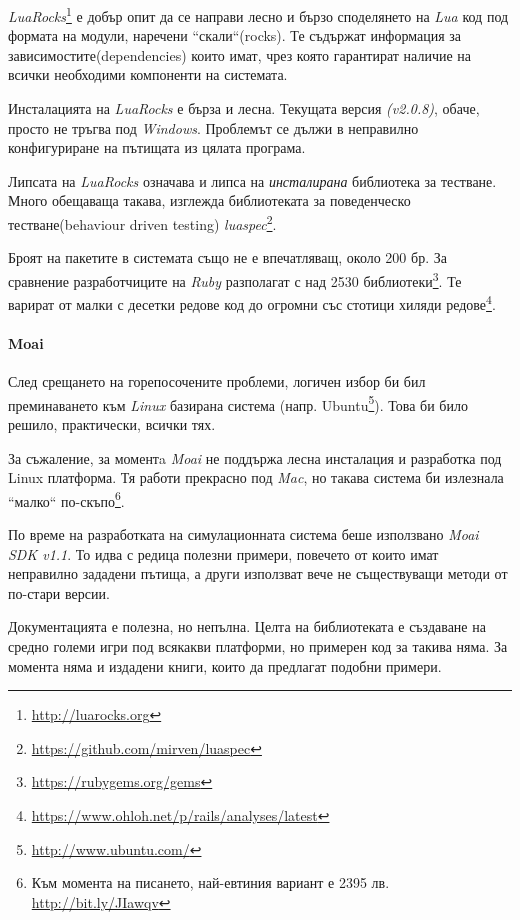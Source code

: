 		\emph{LuaRocks}\footnote{\url{http://luarocks.org}} е добър опит да се направи лесно и бързо
		споделянето на \emph{Lua} код под формата на модули, наречени ``скали``(rocks). 
		Те съдържат информация за зависимостите(dependencies) които имат, чрез която гарантират
		наличие на всички необходими компоненти на системата.
		
		Инсталацията на \emph{LuaRocks} е бърза и лесна. Текущата версия \emph{(v2.0.8)}, обаче,
		просто не тръгва под \emph{Windows}. Проблемът се дължи в неправилно конфигуриране на пътищата
		из цялата програма.
		
		Липсата на \emph{LuaRocks} означава и липса на \emph{инсталирана} библиотека за тестване.
		Много обещаваща такава, изглежда библиотеката за поведенческо тестване(behaviour driven testing) 
		\emph{luaspec}\footnote{\url{https://github.com/mirven/luaspec}}.
		
		Броят на пакетите в системата също не е впечатляващ, около 200 бр. За сравнение разработчиците
		на \emph{Ruby} разполагат с над 2530 библиотеки\footnote{\url{https://rubygems.org/gems}}. 
		Те варират от малки с десетки редове код до огромни
		със стотици хиляди редове\footnote{\url{https://www.ohloh.net/p/rails/analyses/latest}}.
		
	\paragraph{Moai}
	
		След срещането на горепосочените проблеми, логичен избор би бил преминаването 
		към \emph{Linux} базирана система (напр. Ubuntu\footnote{\url{http://www.ubuntu.com/}}). 
		Това би било решило, практически, всички тях.
		
		За съжаление, за моментa \emph{Moai} не поддържа лесна инсталация и разработка под Linux платформа.
		Тя работи прекрасно под \emph{Mac}, но такава система би излезнала ``малко`` 
		по-скъпо\footnote{Към момента на писането, най-евтиния вариант е 2395 лв. \url{http://bit.ly/JIawqv}}.
		
		По време на разработката на симулационната система беше използвано \emph{Moai SDK v1.1}.
		То идва с редица полезни примери, повечето от които имат неправилно зададени пътища, а други
		използват вече не съществуващи методи от по-стари версии.
		
		Документацията е полезна, но непълна. Целта на библиотеката е създаване на средно големи игри под всякакви платформи, 
		но примерен код за такива няма. За момента няма и издадени книги, които да предлагат подобни примери.				
		
		